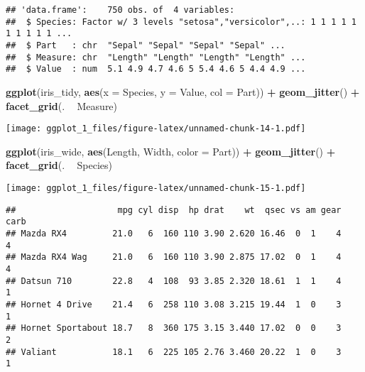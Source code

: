 \documentclass[]{article}
\newenvironment{Shaded}{\begin{snugshade}}{\end{snugshade}}
\newcommand{\DataTypeTok}[1]{\textcolor[rgb]{0.13,0.29,0.53}{#1}}
\newcommand{\KeywordTok}[1]{\textcolor[rgb]{0.13,0.29,0.53}{\textbf{#1}}}
\newcommand{\NormalTok}[1]{#1}
\newcommand{\OperatorTok}[1]{\textcolor[rgb]{0.81,0.36,0.00}{\textbf{#1}}}
\newcommand{\StringTok}[1]{\textcolor[rgb]{0.31,0.60,0.02}{#1}}
\begin{document}
\begin{verbatim}
## 'data.frame':    750 obs. of  4 variables:
##  $ Species: Factor w/ 3 levels "setosa","versicolor",..: 1 1 1 1 1 1 1 1 1 1 ...
##  $ Part   : chr  "Sepal" "Sepal" "Sepal" "Sepal" ...
##  $ Measure: chr  "Length" "Length" "Length" "Length" ...
##  $ Value  : num  5.1 4.9 4.7 4.6 5 5.4 4.6 5 4.4 4.9 ...
\end{verbatim}

\begin{Shaded}
\begin{Highlighting}[]
\KeywordTok{ggplot}\NormalTok{(iris_tidy, }\KeywordTok{aes}\NormalTok{(}\DataTypeTok{x =}\NormalTok{ Species, }\DataTypeTok{y =}\NormalTok{ Value, }\DataTypeTok{col =}\NormalTok{ Part)) }\OperatorTok{+}\StringTok{ }
\StringTok{  }\KeywordTok{geom_jitter}\NormalTok{() }\OperatorTok{+}\StringTok{ }
\StringTok{  }\KeywordTok{facet_grid}\NormalTok{(. }\OperatorTok{~}\StringTok{ }\NormalTok{Measure)}
\end{Highlighting}
\end{Shaded}

\texttt{[image: ggplot\_1\_files/figure-latex/unnamed-chunk-14-1.pdf]}

\begin{Shaded}
\begin{Highlighting}[]
\KeywordTok{ggplot}\NormalTok{(iris_wide, }\KeywordTok{aes}\NormalTok{(Length, Width, }\DataTypeTok{color =}\NormalTok{ Part)) }\OperatorTok{+}\StringTok{ }\KeywordTok{geom_jitter}\NormalTok{() }\OperatorTok{+}\StringTok{ }\KeywordTok{facet_grid}\NormalTok{(. }\OperatorTok{~}\StringTok{ }\NormalTok{Species)}
\end{Highlighting}
\end{Shaded}

\texttt{[image: ggplot\_1\_files/figure-latex/unnamed-chunk-15-1.pdf]}

\begin{Shaded}
\end{Shaded}

\begin{verbatim}
##                    mpg cyl disp  hp drat    wt  qsec vs am gear carb
## Mazda RX4         21.0   6  160 110 3.90 2.620 16.46  0  1    4    4
## Mazda RX4 Wag     21.0   6  160 110 3.90 2.875 17.02  0  1    4    4
## Datsun 710        22.8   4  108  93 3.85 2.320 18.61  1  1    4    1
## Hornet 4 Drive    21.4   6  258 110 3.08 3.215 19.44  1  0    3    1
## Hornet Sportabout 18.7   8  360 175 3.15 3.440 17.02  0  0    3    2
## Valiant           18.1   6  225 105 2.76 3.460 20.22  1  0    3    1
\end{verbatim}
\end{document}
